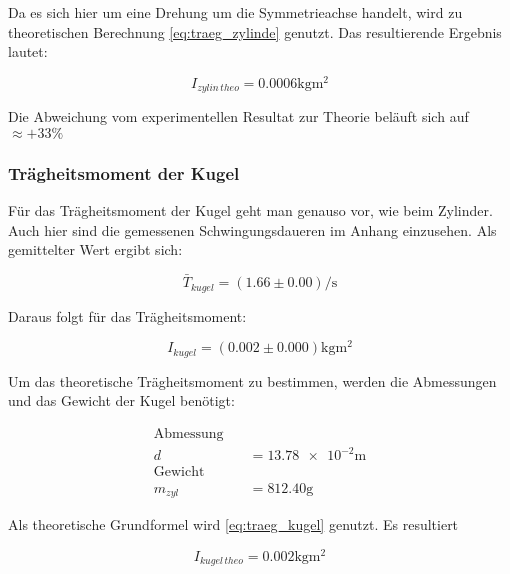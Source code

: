 Da es sich hier um eine Drehung um die Symmetrieachse handelt, wird zu
theoretischen Berechnung \eqref{eq:traeg_zylinde} genutzt.
Das resultierende Ergebnis lautet:

\begin{equation}
\label{eq:traeg_zylinder_theo}
I_{zylin \,theo}= \num{0.0006}\si{\kilogram\meter\squared}
\end{equation}

Die Abweichung vom experimentellen Resultat zur Theorie beläuft sich auf $\approx +33 \%$ %

\subsubsection{Trägheitsmoment der Kugel}

Für das Trägheitsmoment der Kugel geht man genauso vor, wie beim Zylinder. %
 Auch hier sind die gemessenen Schwingungsdaueren im Anhang einzusehen.
Als gemittelter Wert ergibt sich:

\begin{equation*}
\bar{T}_{kugel}=\left(\num{1.66}\pm\num{0.00}\right) \si{\per\second}
\end{equation*}

Daraus folgt für das Trägheitsmoment:

\begin{equation}
\label{eq:traeg_kugel_exp}
I_{kugel}=\left(\num{0.002}\pm\num{0.000}\right) \si{\kilogram\meter\squared}
\end{equation}

Um das theoretische Trägheitsmoment zu bestimmen, werden die Abmessungen und das Gewicht der Kugel benötigt:

\begin{align*}
\text{Abmessung} \quad &\\
d&=\num{13.78e-2}\si{\meter}\\
\text{Gewicht} \quad &\\
m_{zyl}&=\num{812.40}\si{\gram}
\end{align*}

Als theoretische Grundformel wird \eqref{eq:traeg_kugel} genutzt.
Es resultiert

\begin{equation}
\label{eq:traeg_kugel_theo}
I_{kugel \,theo}= \num{0.002}\si{\kilogram\meter\squared}
\end{equation}

